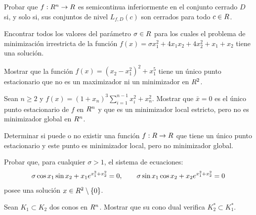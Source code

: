 \begin{exercise}\label{v1:ejer:1.12}
 Probar que $f : R^n \to R$ es semicontinua inferiormente en el conjunto cerrado $D$ si, y solo si, sus conjuntos de nivel $L_{f,D}(c)$ son cerrados para todo $c \in R$.
\end{exercise}


\begin{exercise}\label{v1:ejer:1.13}
 Encontrar todos los valores del parámetro $\sigma \in R$ para los cuales el problema de minimización irrestricta de la función $f(x) = \sigma x_1^2 + 4x_1x_2 + 4x_2^2 + x_1 + x_2$ tiene una solución.
\end{exercise}

\begin{exercise}\label{v1:ejer:1.14}
 Mostrar que la función $f(x) = (x_2 - x_1^2)^2 + x_1^5$ tiene un único punto estacionario que no es un maximizador ni un minimizador en $R^2$.
\end{exercise}

\begin{exercise}\label{v1:ejer:1.15}
 Sean $n \ge 2$ y $f(x) = (1 + x_n)^3 \sum_{i=1}^{n-1} x_i^2 + x_n^2$. Mostrar que $\bar{x} = 0$ es el único punto estacionario de $f$ en $R^n$ y que es un minimizador local estricto, pero no es minimizador global en $R^n$.
\end{exercise}

\begin{exercise}\label{v1:ejer:1.16}
 Determinar si puede o no existir una función $f : R \to R$ que tiene un único punto estacionario y este punto es minimizador local, pero no minimizador global.
\end{exercise}

\begin{exercise}\label{v1:ejer:1.17}
 Probar que, para cualquier $\sigma > 1$, el sistema de ecuaciones:
 \[
 \sigma \cos x_1 \sin x_2 + x_1 e^{x_1^2 + x_2^2} = 0, \qquad
 \sigma \sin x_1 \cos x_2 + x_2 e^{x_1^2 + x_2^2} = 0
 \]
 posee una solución $x \in R^2 \setminus \{0\}$.
\end{exercise}


\begin{exercise}\label{v1:ejer:1.18}
 Sean $K_1 \subset K_2$ dos conos en $R^n$. Mostrar que su cono dual verifica $K_2^* \subset K_1^*$.
\end{exercise}

